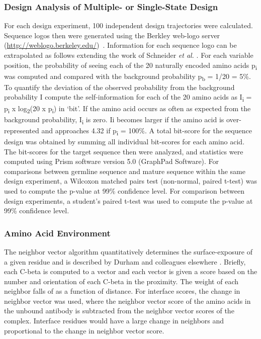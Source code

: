 \subsubsection{Design Analysis of Multiple- or Single-State Design}
For each design experiment, 100 independent design trajectories were calculated. Sequence logos then were generated using the Berkley web-logo server (\url{http://weblogo.berkeley.edu/})~\citep{Crooks:2004do}. Information for each sequence logo can be extrapolated as follows extending the work of Schneider \textit{et al.} \citep{Schneider:1990ub}. For each variable position, the probability of seeing each of the 20 naturally encoded amino acids p\textsubscript{i} was computed and compared with the background probability p\textsubscript{b} = 1/20 = 5\%. To quantify the deviation of the observed probability from the background probability I compute the self-information for each of the 20 amino acids as I\textsubscript{i} = p\textsubscript{i} x log\textsubscript{2}(20 x p\textsubscript{i}) in `bit'. If the amino acid occurs as often as expected from the background probability, I\textsubscript{i} is zero. Ii becomes larger if the amino acid is over-represented and approaches 4.32 if p\textsubscript{i} = 100\%. A total bit-score for the sequence design was obtained by summing all individual bit-scores for each amino acid. The bit-scores for the target sequence then were analyzed, and statistics were computed using Prism software version 5.0 (GraphPad Software).  For comparisons between germline sequence and mature sequence within the same design experiment, a Wilcoxon matched pairs test (non-normal, paired t-test) was used to compute the p-value at 99\% confidence level. For comparison between design experiments, a student's paired t-test was used to compute the p-value at 99\% confidence level.

\subsubsection{Amino Acid Environment}
The neighbor vector algorithm quantitatively determines the surface-exposure of a given residue and is described by Durham and colleagues elsewhere \citep{Durham:2009kt}. Briefly, each C-beta is computed to a vector and each vector is given a score based on the number and orientation of each C-beta in the proximity. The weight of each neighbor falls of as a function of distance.
For interface scores, the change in neighbor vector was used, where the neighbor vector score of the amino acids in the unbound antibody is subtracted from the neighbor vector scores of the complex. Interface residues would have a large change in neighbors and proportional to the change in neighbor vector score.

